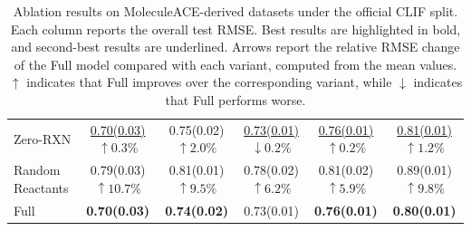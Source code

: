 \begin{table}[t]
{\begin{tabular}{l*{5}{c}}
Zero-RXN
& \shortstack{\underline{0.70(0.03)}\\$\uparrow 0.3\%$}
& \shortstack{0.75(0.02)\\$\uparrow 2.0\%$}
& \shortstack{\underline{0.73(0.01)}\\$\downarrow 0.2\%$}
& \shortstack{\underline{0.76(0.01)}\\$\uparrow 0.2\%$}
& \shortstack{\underline{0.81(0.01)}\\$\uparrow 1.2\%$} \\

Random Reactants
& \shortstack{0.79(0.03)\\$\uparrow 10.7\%$}
& \shortstack{0.81(0.01)\\$\uparrow 9.5\%$}
& \shortstack{0.78(0.02)\\$\uparrow 6.2\%$}
& \shortstack{0.81(0.02)\\$\uparrow 5.9\%$}
& \shortstack{0.89(0.01)\\$\uparrow 9.8\%$} \\

Full
& \textbf{0.70(0.03)}
& \textbf{0.74(0.02)}
& 0.73(0.01)
& \textbf{0.76(0.01)}
& \textbf{0.80(0.01)} \\

\hline
\end{tabular}
}
\caption{Ablation results on MoleculeACE-derived datasets under the official CLIF split. Each column reports the overall test RMSE. Best results are highlighted in bold, and second-best results are underlined. Arrows report the relative RMSE change of the Full model compared with each variant, computed from the mean values. $\uparrow$ indicates that Full improves over the corresponding variant, while $\downarrow$ indicates that Full performs worse.}
\label{tab:clif_ablation_test}
\end{table}
